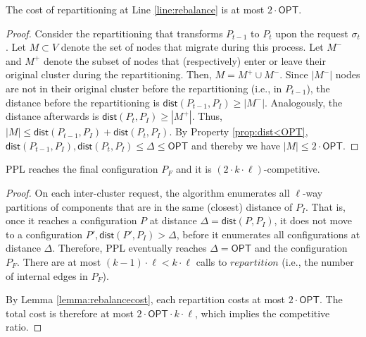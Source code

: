 \documentclass[manuscript,screen=true, review, anonymous]{acmart}
\newcommand{\OPT}{\textsf{OPT}\xspace}
\newcommand{\PPL}{\textsf{PPL}\xspace}
\newcommand{\dist}{\textsf{dist}}
\newcommand\mahmoud[1]{}
\newcommand\maciek[1]{}
\begin{document}
\begin{lemma}	\label{lemma:rebalancecost}
	The cost of repartitioning at Line \ref{line:rebalance} is at most $2\cdot\OPT$.
	\maciek{Express the reconfiguration without pseudocode?}
\end{lemma}
\begin{proof}
	Consider the repartitioning that transforms $P_{t-1}$ to $P_t$ upon the request $\sigma_t$.
	Let $M \subset V$ denote the set of nodes that migrate during this process.
	Let $M^-$ and $M^+$ denote the subset of nodes that (respectively)
	enter or leave their original cluster during the repartitioning.    
	Then,
	$M = M^+ \cup M^-$.
	Since \maciek{at least?} $|M^-|$ nodes are not in their original cluster before the repartitioning (i.e., in $P_{t-1}$),
	the distance before the repartitioning is $\dist(P_{t-1},P_I) \geq | M^-|$.
	Analogously,
	the distance afterwards is $\dist(P_{t},P_I) \geq | M^+|$.
	Thus,
	$|M| \leq \dist(P_{t-1},P_I) + \dist(P_{t},P_I)$.
	By Property \ref{prop:dist<OPT},
	$\dist(P_{t-1},P_I) , \dist(P_{t},P_I) \leq \Delta \leq \OPT$
	and thereby we have	
	$|M| \leq 2\cdot\OPT$.
	\maciek{the comma between $\dist$ is confusing. BOTH are bounded? If so, expand the sentence and write both individual bounds.}
\end{proof}

\begin{theorem}	\label{thm:upperbound}
	\PPL reaches the final configuration $P_F$ and it is $(2\cdot k\cdot\ell)$-competitive.
	\maciek{Do not hide that we have $2(k-1)\ell$ in the theorem. This is a better bound.}
\end{theorem}
\begin{proof}
	On each inter-cluster request,
	the algorithm enumerates all $\ell$-way partitions of components
	that are in the same (closest) distance of $P_I$.
	That is, 
	once it reaches a configuration $P$ at distance $\Delta = \dist(P, P_I)$,
	it does not move to a configuration
	$P', \dist(P', P_I) > \Delta$,
	before it enumerates all configurations at distance $\Delta$.
	Therefore,
	\PPL eventually reaches $\Delta=\OPT$ and the configuration $P_F$.
	There are at most $(k-1)\cdot\ell < k\cdot\ell $ calls   to $\mathit{repartition}$
	(i.e., the number of internal edges in $P_F$).
	\maciek{Clarify why the number of internal edges bound the number of repartitions.}
	By Lemma \ref{lemma:rebalancecost},
	each repartition costs at most $2\cdot\OPT$.
	The total cost is therefore at most $2\cdot\OPT\cdot k\cdot\ell$, which implies the competitive ratio.
\end{proof}
\end{document}
